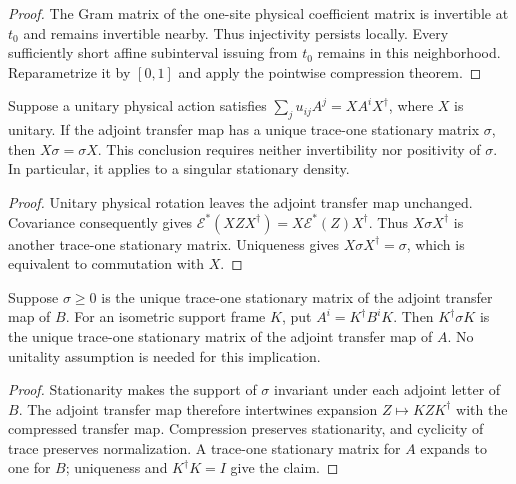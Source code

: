 \begin{proof}\leanok
    The Gram matrix of the one-site physical coefficient matrix is
    invertible at $t_0$ and remains invertible nearby. Thus injectivity
    persists locally. Every sufficiently short affine subinterval
    issuing from $t_0$ remains in this neighborhood. Reparametrize it
    by $[0,1]$ and apply the pointwise compression theorem.
\end{proof}

\begin{lemma}
    \label{thm:spt_unique_stationary_symmetry}
    \leanok
    Suppose a unitary physical action satisfies
    $\sum_j u_{ij}A^j=XA^iX^\dagger$, where $X$ is unitary.
    If the adjoint transfer map has a unique trace-one stationary
    matrix $\sigma$, then $X\sigma=\sigma X$.
    This conclusion requires neither invertibility nor positivity of
    $\sigma$. In particular, it applies to a singular stationary density.
\end{lemma}

\begin{proof}\leanok
    Unitary physical rotation leaves the adjoint transfer map unchanged.
    Covariance consequently gives
    $\mathcal E^*(XZX^\dagger)=X\mathcal E^*(Z)X^\dagger$.
    Thus $X\sigma X^\dagger$ is another trace-one stationary matrix.
    Uniqueness gives $X\sigma X^\dagger=\sigma$, which is equivalent
    to commutation with $X$.
\end{proof}

\begin{lemma}
    \label{thm:spt_stationary_density_compression}
    \leanok
    Suppose $\sigma\geq0$ is the unique trace-one stationary matrix
    of the adjoint transfer map of $B$. For an isometric support frame
    $K$, put $A^i=K^\dagger B^iK$. Then $K^\dagger\sigma K$ is the
    unique trace-one stationary matrix of the adjoint transfer map of $A$.
    No unitality assumption is needed for this implication.
\end{lemma}

\begin{proof}\leanok
    Stationarity makes the support of $\sigma$ invariant under each
    adjoint letter of $B$. The adjoint transfer map therefore intertwines
    expansion $Z\mapsto KZK^\dagger$ with the compressed transfer map.
    Compression preserves stationarity, and cyclicity of trace preserves
    normalization. A trace-one stationary matrix for $A$ expands to one
    for $B$; uniqueness and $K^\dagger K=I$ give the claim.
\end{proof}

